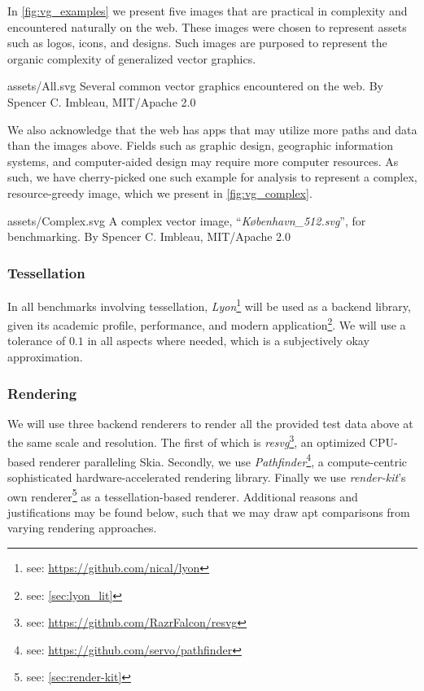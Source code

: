 In \cref{fig:vg_examples} we present five images that are practical in complexity and encountered naturally on the web. These images were chosen to represent assets such as logos, icons, and designs. Such images are purposed to represent the organic complexity of generalized vector graphics.\medskip
 
\widesvg
{assets/All.svg}
{Several common vector graphics encountered on the web.\label{fig:vg_examples}}
{By Spencer C. Imbleau, MIT/Apache 2.0}\medskip

We also acknowledge that the web has apps that may utilize more paths and data than the images above. Fields such as graphic design, geographic information systems, and computer-aided design may require more computer resources. As such, we have cherry-picked one such example for analysis to represent a complex, resource-greedy image, which we present in \cref{fig:vg_complex}.\medskip

\svg
{assets/Complex.svg}
{A complex vector image, ``\textit{København\_512.svg}'', for benchmarking.\label{fig:vg_complex}}
{By Spencer C. Imbleau, MIT/Apache 2.0}

\subsubsection{Tessellation}\label{sec:instrumentation_tessellator} In all benchmarks involving tessellation, \textit{Lyon}\footnote{see: \href{https://github.com/nical/lyon}{https://github.com/nical/lyon}} will be used as a backend library, given its academic profile\cite{Silva18}, performance\cite{Lyon_Sweep}, and modern application\footnote{see: \cref{sec:lyon_lit}}. We will use a tolerance of \(0.1\) in all aspects where needed, which is a subjectively okay approximation.\medskip

\subsubsection{Rendering}\label{sec:instrumentation_renderers} We will use three backend renderers to render all the provided test data above at the same scale and resolution. The first of which is \textit{resvg}\footnote{see: \href{https://github.com/RazrFalcon/resvg}{https://github.com/RazrFalcon/resvg}}, an optimized CPU-based renderer paralleling Skia. Secondly, we use \textit{Pathfinder}\footnote{see: \href{https://github.com/servo/pathfinder}{https://github.com/servo/pathfinder}}, a compute-centric sophisticated hardware-accelerated rendering library. Finally we use \textit{render-kit}'s own renderer\footnote{see: \cref{sec:render-kit}} as a tessellation-based renderer. Additional reasons and justifications may be found below, such that we may draw apt comparisons from varying rendering approaches.

